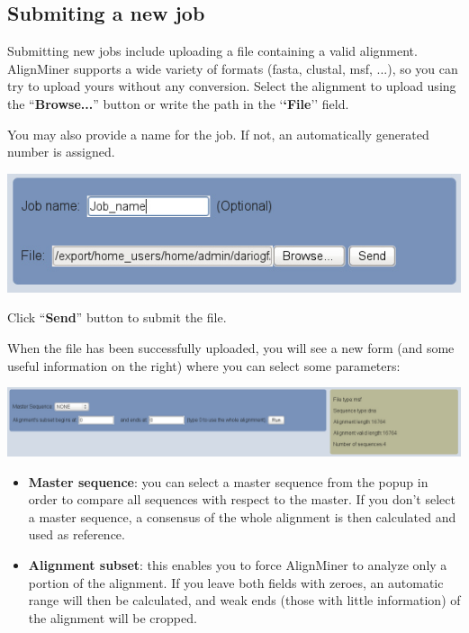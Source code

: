 \documentclass[12pt,oneside,a4paper,english]{article}  %
\begin{document}
\subsection*{Submiting a new job}

Submitting new jobs include uploading a file containing a valid alignment. AlignMiner supports a wide variety of formats (fasta, clustal, msf, ...), so you can try to upload yours without any conversion. Select the alignment to upload using the ``\textbf{Browse...}'' button or write the path in the `\textbf{`File}'' field.

You may also provide a name for the job. If not, an automatically generated number is assigned.

\begin{center}
		\includegraphics[width=.6\linewidth]{pics/submit.jpg}
\end{center}

Click ``\textbf{Send}'' button to submit the file.

When the file has been successfully uploaded, you will see a new form (and some useful information on the right) where you can select some parameters:

\begin{center}
		\includegraphics[width=\linewidth]{pics/params.jpg}
\end{center}

\begin{itemize}
\item \textbf{Master sequence}: you can select a master sequence from the popup in order to compare all sequences with respect to the master. If you don't select a master sequence,  a consensus of the whole alignment is then calculated and used as reference.
\item \textbf{Alignment subset}: this enables you to force AlignMiner to analyze only a portion of the alignment. If you leave both fields with zeroes, an automatic range will then be calculated, and weak ends (those with little information) of the alignment will be cropped.
\end{itemize}
\end{document}
